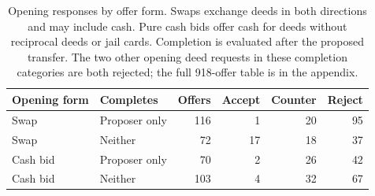 \begin{table}[t]\centering\small
\begin{tabularx}{\linewidth}{@{}lYrrrr@{}}\toprule
Opening form & Completes & Offers & Accept & Counter & Reject\\\midrule
Swap & Proposer only & 116 & 1 & 20 & 95 \\
Swap & Neither & 72 & 17 & 18 & 37 \\
Cash bid & Proposer only & 70 & 2 & 26 & 42 \\
Cash bid & Neither & 103 & 4 & 32 & 67 \\
\bottomrule\end{tabularx}
\caption{Opening responses by offer form. Swaps exchange deeds in both directions and may include cash. Pure cash bids offer cash for deeds without reciprocal deeds or jail cards. Completion is evaluated after the proposed transfer. The two other opening deed requests in these completion categories are both rejected; the full 918-offer table is in the appendix.}
\label{tab:opening}\end{table}

